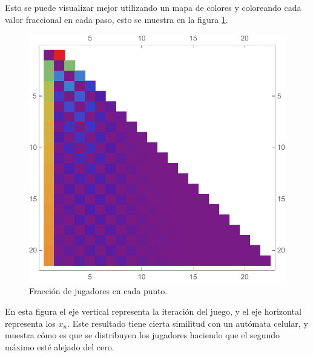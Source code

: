 \documentclass[letterpaper,11pt]{article}
\begin{document}
Esto se puede visualizar mejor utilizando un mapa de colores y coloreando cada valor fraccional en cada paso, esto se muestra en la figura \ref{fig:AC}.
\begin{figure}[h!]
\centering
\includegraphics[scale=0.6]{img/Fig7}
\caption{Fracción de jugadores en cada punto.}
\label{fig:AC}
\end{figure}
En esta figura el eje vertical representa la iteración del juego, y el eje horizontal representa los $x_n$. Este resultado tiene cierta similitud con un autómata celular, y muestra cómo es que se distribuyen los jugadores haciendo que el segundo máximo esté alejado del cero.
\end{document}
